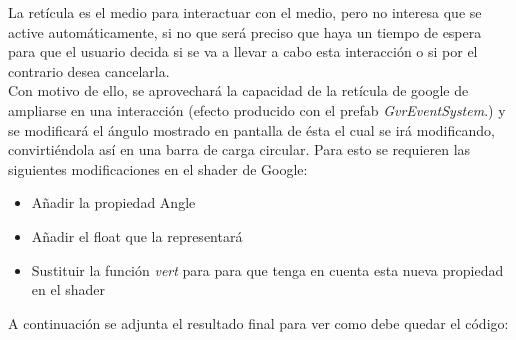 \quad La retícula es el medio para interactuar con el medio, pero no interesa que se active automáticamente, si no que será preciso que haya un tiempo de espera para que el usuario decida si se va a llevar a cabo esta interacción o si por el contrario desea cancelarla.\\

\quad Con motivo de ello, se aprovechará la capacidad de la retícula de google de ampliarse en una interacción (efecto producido con el prefab \textit{GvrEventSystem}.) y se modificará el ángulo mostrado en pantalla de ésta el cual se irá modificando, convirtiéndola así en una barra de carga circular. Para esto se requieren las siguientes modificaciones en el shader \cite{ShadersTut} de Google:

\begin{itemize}
	\item Añadir la propiedad Angle
	\item Añadir el float que la representará
	\item Sustituir la función \textit{vert} para para que tenga en cuenta esta nueva propiedad en el shader
\end{itemize}
\FloatBarrier

\quad A continuación se adjunta el resultado final para ver como debe quedar el código:

